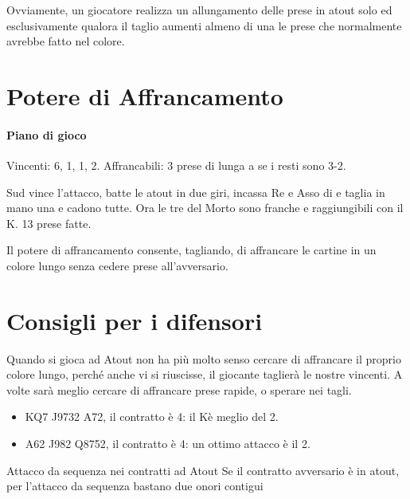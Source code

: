 \documentclass[../corsofiori.tex]{subfiles}
\begin{document}
Ovviamente, un giocatore realizza un allungamento delle prese in atout solo ed esclusivamente qualora il taglio aumenti
almeno di una le prese che normalmente avrebbe fatto nel colore.

\section{Potere di Affrancamento}

\newgame
{}
\leftupper{\boardtext*}%
{\dealertext\quad}{\vulnertext}

\showAll*

\paragraph{Piano di gioco} Vincenti: 6\Sp, 1\He, 1\Di, 2\Cl. Affrancabili: 3 prese di lunga a \fio se i resti sono 3-2.

Sud vince l'attacco, batte le atout in due giri, incassa Re e Asso di \fio e taglia in mano una \fio e cadono tutte. Ora
le tre \fio del Morto sono franche e raggiungibili con il K\He. 13 prese fatte.

Il potere di affrancamento consente, tagliando, di affrancare le cartine in un colore lungo senza cedere prese
all'avversario.

\section{Consigli per i difensori}

Quando si gioca ad Atout non ha più molto senso cercare di affrancare il proprio colore lungo, perché anche vi si
riuscisse, il giocante taglierà le nostre vincenti. A volte sarà meglio cercare di affrancare prese rapide, o sperare
nei tagli.
\begin{itemize}
    \item \Sp KQ7  \Di J9732 \Cl A72, il contratto è 4\He: il K\Sp è meglio del 2\Di.
    \item {} \He A62 \Di J982 \Cl Q8752, il contratto è 4\He: un ottimo attacco è il 2\Sp.
\end{itemize}

\begin{regola}{Attacco da sequenza nei contratti ad Atout}
    Se il contratto avversario è in atout, per l'attacco da sequenza bastano due onori contigui
\end{regola}
\end{document}
